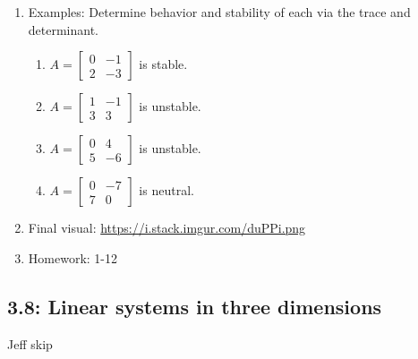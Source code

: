 \documentclass{article}
\newcommand{\ds}{\displaystyle}
\begin{document}
\begin{enumerate}
\item Examples: Determine behavior and stability of each via the trace and determinant.
\begin{enumerate}
\item $ \ds A = \begin{bmatrix}
0 & -1 \\ 2 & -3
\end{bmatrix}$ is stable.
\item $ \ds A = \begin{bmatrix}
1 & -1 \\ 3 & 3
\end{bmatrix}$ is unstable.
\item $ \ds A = \begin{bmatrix}
0 & 4 \\ 5 & -6
\end{bmatrix}$ is unstable.
\item $ \ds A = \begin{bmatrix}
0 & -7 \\ 7 & 0
\end{bmatrix}$ is neutral.
\end{enumerate}

\item Final visual: \url{https://i.stack.imgur.com/duPPi.png}

\item Homework: 1-12

\end{enumerate}

\subsection{3.8: Linear systems in three dimensions}
Jeff skip
\end{document}
